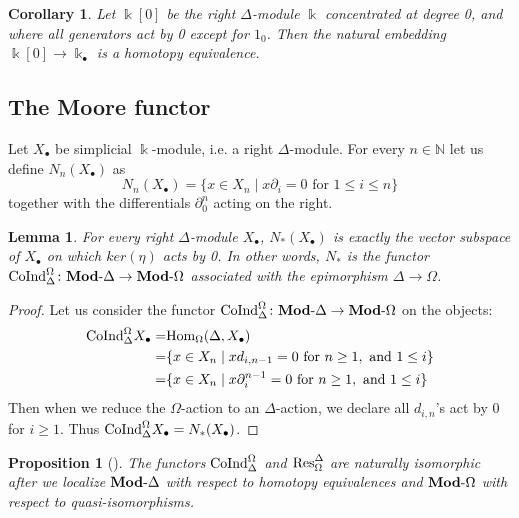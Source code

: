 \documentclass[a4paper,11pt]{amsart}
\newtheorem{proposition}[theorem]{Proposition}
\newtheorem{lemma}[theorem]{Lemma}
\newtheorem{corollary}[theorem]{Corollary}
\theoremstyle{definition}
\newcommand{\B}[1]{\mathbb{#1}}
\newcommand{\rmod}[1]{\text{{\bf Mod}-}{#1}}
\newcommand{\Res}{\text{\rm Res}}
\newcommand{\Hom}{\text{\rm Hom}}
\newcommand{\CoInd}{\text{\rm CoInd}}
\newcommand{\Simp}{{\Delta}}
\newcommand{\Diff}{{\Omega}}
\begin{document}
\begin{corollary}
  Let $\Bbbk[0]$ be the right $\Simp$-module $\Bbbk$ concentrated at degree 0, and where all generators act by 0 except for $1_0$.  Then the natural embedding $\Bbbk[0]\to \Bbbk_\bullet$ is a homotopy equivalence.
\end{corollary}

\subsection{The Moore functor}

Let $X_\bullet$ be simplicial $\Bbbk$-module, i.e. a right $\Simp$-module. For every $n\in\B{N}$ let us define $N_n(X_\bullet)$ as
\begin{equation}
    N_n(X_\bullet) = \{ x\in X_n\mid x\partial_i = 0 \text{ for } 1\leq i\leq n \}
\end{equation}
together with the differentials $\partial_0^n$ acting on the right.

\begin{lemma}
  For every right $\Simp$-module $X_\bullet$, $N_*(X_\bullet)$ is exactly the vector subspace of $X_\bullet$ on which $ker(\eta)$ acts by 0. In other words, $N_*$ is the functor $\CoInd_{\Simp}^{\Diff}\colon \rmod{\Simp}\to \rmod{\Diff}$ associated with the epimorphism $\Simp\to \Diff$.
\end{lemma}

\begin{proof}
  Let us consider the functor $\CoInd_{\Simp}^{\Diff}\colon \rmod{\Simp}\to\rmod{\Diff}$ on the objects:
  \begin{align}
    \CoInd_{\Simp}^{\Diff}X_\bullet 
    = & \Hom_{\Diff}(\Simp,X_\bullet) \\
    = & \{x\in X_n\mid x d_{i,n-1} = 0 \text{ for } n\geq 1, \text{ and } 1\leq i\}\\
    = & \{x\in X_n\mid x \partial^{n-1}_i = 0 \text{ for } n\geq 1, \text{ and } 1\leq i\} 
  \end{align}
  Then when we reduce the $\Diff$-action  to an $\Simp$-action, we declare all $d_{i,n}$'s act by 0 for $i\geq 1$. Thus $\CoInd_{\Simp}^{\Diff}X_\bullet = N_*(X_\bullet)$.
\end{proof}

\begin{proposition}[{\cite[8.3.8]{Weibel:HomologicalAlgebra}}{\cite[Theorem III 2.1]{GoerssJardine:SimplicialHomotopy}}]\label{prop:equivalence}
  The functors $\CoInd_{\Simp}^{\Diff}$ and $\Res^{\Simp}_{\Diff}$ are naturally isomorphic after we localize $\rmod{\Simp}$ with respect to homotopy equivalences and $\rmod{\Diff}$ with respect to quasi-isomorphisms.
 \end{proposition}
\end{document}
